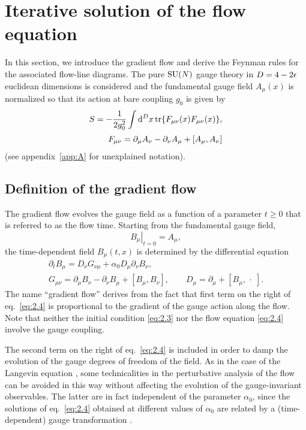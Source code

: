 \section{Iterative solution of the flow equation}\label{sec:iterative}

In this section, we introduce the gradient flow
and derive the Feynman rules for the associated flow-line diagrams.
The pure $\mathrm{SU}(N)$ gauge theory in $D=4-2\epsilon$
euclidean dimensions is considered and
the fundamental gauge field $A_{\mu}(x)$ is normalized so that
its action at bare coupling $g_0$ is given by
\begin{align}
  S=-\frac{1}{2g_0^2}\int\mathrm{d}^Dx\,\mathrm{tr}\{F_{\mu\nu}(x)F_{\mu\nu}(x)\},
  \label{eq:2.1}\\[2pt]
  F_{\mu\nu}=\partial_{\mu}A_{\nu}-\partial_{\nu}A_{\mu}+[A_{\mu},A_{\nu}]
  \label{eq:2.2}
\end{align}
(see appendix~\ref{app:A} for unexplained notation).

\subsection{Definition of the gradient flow}\label{ssec:defflow}

The gradient flow evolves the gauge field as a function
of a parameter $t\geq0$ that is referred to as the flow time.
Starting from the fundamental gauge field,
\begin{equation}
  \left.B_{\mu}\right|_{t=0}=A_{\mu},
  \label{eq:2.3}
\end{equation}
the time-dependent field $B_{\mu}(t,x)$
is determined by the differential equation
\begin{align}
  \partial_tB_{\mu}=D_{\nu}G_{\nu\mu}+\alpha_0D_{\mu}\partial_{\nu}B_{\nu},
  \label{eq:2.4}\\[2pt]
  G_{\mu\nu}=\partial_{\mu}B_{\nu}-\partial_{\nu}B_{\mu}+[B_{\mu},B_{\nu}],
  \qquad
  D_{\mu}=\partial_{\mu}+[B_{\mu},\,\cdot\;].
  \label{eq:2.5}
\end{align}
The name ``gradient flow'' derives from the fact that first term on
the right of eq.~\eqref{eq:2.4} is proportional to the gradient of the gauge
action along the flow.
Note that neither the initial condition \eqref{eq:2.3} nor the
flow equation \eqref{eq:2.4} involve the gauge coupling.

The second term on the right of eq.~\eqref{eq:2.4} is included in order to
damp the evolution of the gauge degrees of freedom of the
field. As in the case of the Langevin equation \cite{ZinnZwanziger},
some technicalities in the perturbative analysis of the flow
can be avoided in this way without affecting the evolution
of the gauge-invariant observables.
The latter are in fact independent
of the parameter $\alpha_0$, since
the solutions of eq.~\eqref{eq:2.4} obtained at different values
of $\alpha_0$ are related by
a (time-dependent) gauge transformation \cite{WilsonFlow}.

